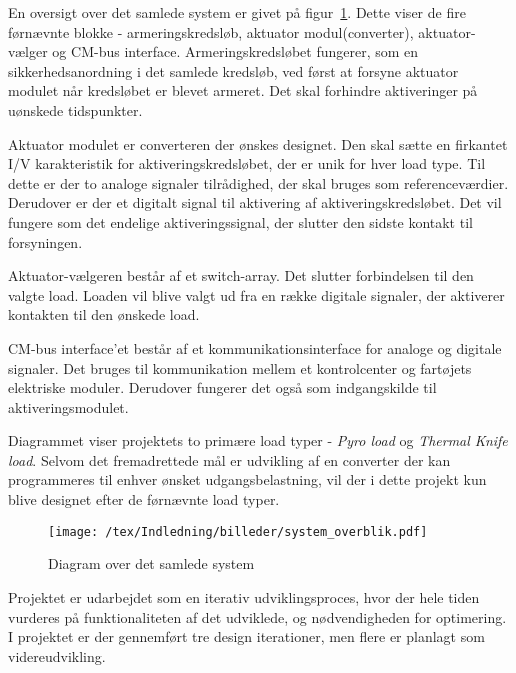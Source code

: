 \noindent En oversigt over det samlede system er givet på figur~\ref{fig:system_overblik}. Dette viser de fire førnævnte blokke - armeringskredsløb, aktuator modul(converter), aktuator-vælger og CM-bus interface. Armeringskredsløbet fungerer, som en sikkerhedsanordning i det samlede kredsløb, ved først at forsyne aktuator modulet når kredsløbet er blevet armeret. Det skal forhindre aktiveringer på uønskede tidspunkter. 

Aktuator modulet er converteren der ønskes designet. Den skal sætte en firkantet I/V karakteristik for aktiveringskredsløbet, der er unik for hver load type. Til dette er der to analoge signaler tilrådighed, der skal bruges som referenceværdier. Derudover er der et digitalt signal til aktivering af aktiveringskredsløbet. Det vil fungere som det endelige aktiveringssignal, der slutter den sidste kontakt til forsyningen. 

Aktuator-vælgeren består af et switch-array. Det slutter forbindelsen til den valgte load. Loaden vil blive valgt ud fra en række digitale signaler, der aktiverer kontakten til den ønskede load.

CM-bus interface'et består af et kommunikationsinterface for analoge og digitale signaler. Det bruges til kommunikation mellem et kontrolcenter og fartøjets elektriske moduler. Derudover fungerer det også som indgangskilde til aktiveringsmodulet. 

Diagrammet viser projektets to primære load typer - \textit{Pyro load} og \textit{Thermal Knife load}. Selvom det fremadrettede mål er udvikling af en converter der kan programmeres til enhver ønsket udgangsbelastning, vil der i dette projekt kun blive designet efter de førnævnte load typer.

\begin{figure}[H]
	\center
	\texttt{[image: /tex/Indledning/billeder/system\_overblik.pdf]}
	\caption{Diagram over det samlede system}
	\label{fig:system_overblik}
\end{figure}

\noindent Projektet er udarbejdet som en iterativ udviklingsproces, hvor der hele tiden vurderes på funktionaliteten af det udviklede, og nødvendigheden for optimering. I projektet er der gennemført tre design iterationer, men flere er planlagt som videreudvikling. 




\clearpage

